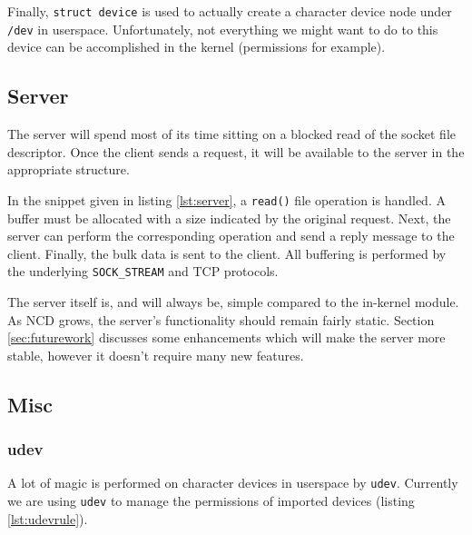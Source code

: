 \documentclass[11pt,twocolumn]{article}
\begin{document}
Finally, \texttt{struct device} is used to actually create a character
device node under \texttt{/dev} in userspace. Unfortunately, not
everything we might want to do to this device can be accomplished in the
kernel (permissions for example).

\subsection{Server}



The server will spend most of its time sitting on a blocked read of the
socket file descriptor. Once the client sends a request, it will be
available to the server in the appropriate structure.

In the snippet given in listing \ref{lst:server}, a \texttt{read()} file
operation is handled. A buffer must be allocated with a size
indicated by the original request. Next, the server can perform the
corresponding operation and send a reply message to the client. Finally,
the bulk data is sent to the client. All buffering is performed by the
underlying \texttt{SOCK\_STREAM} and TCP protocols.

The server itself is, and will always be, simple compared to the
in-kernel module. As NCD grows, the server's functionality should remain
fairly static. Section \ref{sec:futurework} discusses some enhancements
which will make the server more stable, however it doesn't require many
new features.

\subsection{Misc}

\subsubsection{udev}
\label{subsec:udev}



A lot of magic is performed on character devices in userspace by
\texttt{udev}. Currently we are using \texttt{udev} to manage the
permissions of imported devices (listing \ref{lst:udevrule}).


\end{document}
